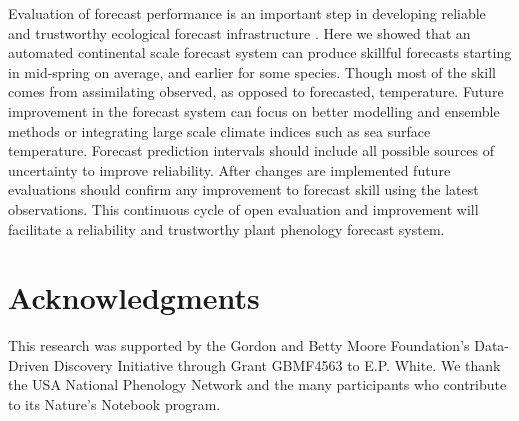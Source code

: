 \documentclass[fleqn,10pt,lineno]{wlpeerj}
\begin{document}
Evaluation of forecast performance is an important step in developing reliable and trustworthy ecological forecast infrastructure \citep{dietze2018}. Here we showed that an automated continental scale forecast system can produce skillful forecasts starting in mid-spring on average, and earlier for some species. Though most of the skill comes from assimilating observed, as opposed to forecasted, temperature. Future improvement in the forecast system can focus on better modelling and ensemble methods or integrating large scale climate indices such as sea surface temperature. Forecast prediction intervals should include all possible sources of uncertainty to improve reliability. After changes are implemented future evaluations should confirm any improvement to forecast skill using the latest observations. This continuous cycle of open evaluation and improvement will facilitate a reliability and trustworthy plant phenology forecast system.


\section*{Acknowledgments}

This research was supported by the Gordon and Betty Moore Foundation’s Data-Driven Discovery Initiative through Grant GBMF4563 to E.P. White. We thank the USA National Phenology Network and the many participants who contribute to its Nature’s Notebook program.


\end{document}
